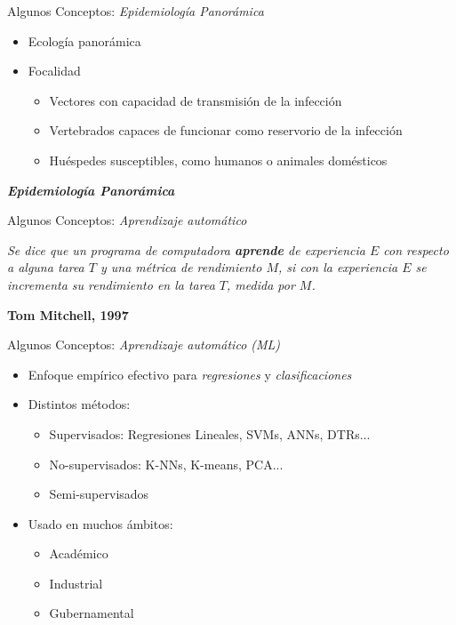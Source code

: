 \documentclass[10pt]{beamer}
\begin{document}
\begin{frame}{Algunos Conceptos: \textit{Epidemiología Panorámica}}
  \begin{itemize}[<+->]
   \item Ecología panorámica
   \item Focalidad
    \begin{itemize}
      \item Vectores con capacidad de transmisión de la infección
      \item Vertebrados capaces de funcionar como reservorio de la infección
      \item Huéspedes susceptibles, como humanos o animales domésticos
    \end{itemize}
    \pause
  \end{itemize}
  \begin{center}
    \textbf{\textit{Epidemiología Panorámica}}
  \end{center}
\end{frame}


\begin{frame}{Algunos Conceptos: \textit{Aprendizaje automático}}
  \begin{framed}
    \begin{center}
      \textit{Se dice que un programa de computadora \textbf{aprende} de experiencia
      $E$ con respecto a alguna tarea $T$ y una métrica de rendimiento $M$, si
      con la experiencia $E$ se incrementa su rendimiento en la tarea $T$,
      medida por $M$.}\\
    \end{center}
    \centering \textbf{Tom Mitchell, 1997} \cite{mitchell_learn}
  \end{framed}

\end{frame}



\begin{frame}{Algunos Conceptos: \textit{Aprendizaje automático (ML)}}
\begin{itemize}
  \item Enfoque empírico efectivo para \textit{regresiones} y \textit{clasificaciones}
  \item Distintos métodos:
    \begin{itemize}
      \item Supervisados: Regresiones Lineales, SVMs, ANNs, DTRs...
      \item No-supervisados: K-NNs, K-means, PCA...
      \item Semi-supervisados
    \end{itemize}
  \item Usado en muchos ámbitos:
  \begin{itemize}
    \item Académico
    \item Industrial
    \item Gubernamental
  \end{itemize}

\end{itemize}
\end{frame}
\end{document}
